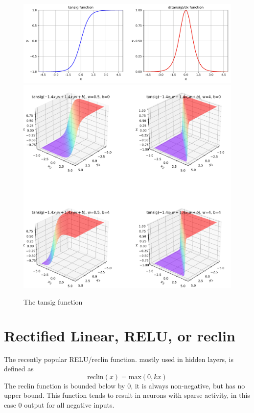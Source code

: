 \begin{figure}[p]
\centering
\includegraphics[width=\textwidth]{pic/tansig01}
\includegraphics[width=\textwidth]{pic/tansig02}
\caption{The tansig function }
\label{fig:tansig}
\end{figure}



\section{Rectified Linear, RELU, or reclin}

The recently popular RELU/reclin function. mostly used in hidden layers, is defined as 
\begin{equation}
\textrm{reclin}(x) = \textrm{max}(0,kx)
\end{equation}
The reclin function is bounded below by 0, it is always non-negative, but has no upper bound.  This function tends to result in neurons with sparse activity, in this case 0 output for all negative inputs.


